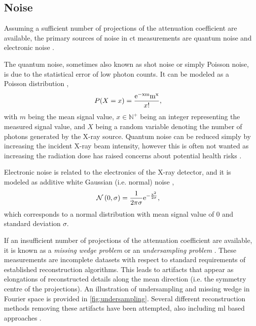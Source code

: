 \subsection{Noise}
\label{sec:ct:theory:noise}
Assuming a sufficient number of projections of the attenuation coefficient are available, the primary sources of noise in \gls{ct} measurements are quantum noise and electronic noise \cite{boas2012ct}. 

The quantum noise, sometimes also known as shot noise or simply Poisson noise, is due to the statistical error of low photon counts. It can be modeled as a Poisson distribution \cite{Whiting2006},
\begin{equation}
    \label{eq:poissonnoise}
    P(X = x) = \frac{\rm{e}^{-xm}m^x}{x!},
\end{equation}
with $m$ being the mean signal value, $x \in \mathbb{N}^+$ being an integer representing the measured signal value, and $X$ being a random variable denoting the number of photons generated by the X-ray source. Quantum noise can be reduced simply by increasing the incident X-ray beam intensity, however this is often not wanted as increasing the radiation dose has raised concerns about potential health risks \cite{doi:10.1056/NEJMra072149,PEARCE2012499}. 

Electronic noise is related to the electronics of the X-ray detector, and it is modeled as additive white Gaussian (i.e. normal) noise \cite{boas2012ct},
\begin{equation}
    \mathcal{N}\left(0,\sigma \right) = \frac{1}{2\pi\sigma}\rm{e}^{-\frac{x^2}{2\sigma}},
\end{equation}
which corresponds to a normal distribution with mean signal value of $0$ and standard deviation $\sigma$.

If an insufficient number of projections of the attenuation coefficient are available, it is known as a \textit{missing wedge problem} or an \textit{undersampling problem} \cite{10.1111/jmi.12313}. These measurements are incomplete datasets with respect to standard requirements of established reconstruction algorithms. This leads to artifacts that appear as elongations of reconstructed details along the mean direction (i.e. the symmetry centre of the projections). An illustration of undersampling and missing wedge in Fourier space is provided in \cref{fig:undersampling}. Several different reconstruction methods removing these artifacts have been attempted, also including \gls{ml} based approaches \cite{10.1111/jmi.12313,liu2020tomogan,GANrec}. 


